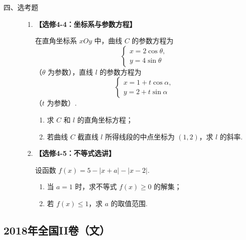 \begin{description}

    \item[四、选考题]

    \begin{enumerate}[leftmargin=5pt]

      \addtocounter{enumi}{+21}

        \item \textbf{【选修4-4：坐标系与参数方程】}

在直角坐标系 \(xOy\) 中，曲线 \(C\) 的参数方程为
\[
\begin{cases}

x=2\cos\theta,\\
y=4\sin\theta

\end{cases}
\]（\(\theta\) 为参数），直线 \(l\) 的参数方程为
\[
\begin{cases}

x=1+t\cos\alpha,\\
y=2+t\sin\alpha

\end{cases}
\]（\(t\) 为参数）.

\begin{enumerate}
\item 求 \(C\) 和 \(l\) 的直角坐标方程；
\item 若曲线 \(C\) 截直线 \(l\) 所得线段的中点坐标为 \((1,2)\)，求 \(l\) 的斜率.
\end{enumerate}

        \item \textbf{【选修4-5：不等式选讲】}

设函数 \(f(x)=5-|x+a|-|x-2|\).

\begin{enumerate}
\item 当 \(a=1\) 时，求不等式 \(f(x)\ge0\) 的解集；
\item 若 \(f(x)\le1\)，求 \(a\) 的取值范围.
\end{enumerate}

    \end{enumerate}

\end{description}


\subsection{2018年全国II卷（文）}\label{gk:2018年全国II卷（文）}


